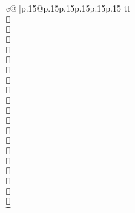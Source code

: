 \documentclass{article}
\begin{document}
{\begin{supertabular}{c@{$\;$}|p{.15\linewidth}@{}p{.15\linewidth}p{.15\linewidth}p{.15\linewidth}p{.15\linewidth}p{.15\linewidth}}
{{{tt 📐\\ \tt 📐\\ \tt 📐\\ \tt 📐\\ \tt 📐\\ \tt 📐\\ \tt 📐\\ \tt 📐\\ \tt 📐\\ \tt 📐\\ \tt 📐\\ \tt 📐\\ \tt 📐\\ \tt 📐\\ \tt 📐\\ \tt 📐\\ \tt 📐\\ \tt 📐\\ \tt 📐\\ \tt 📐\\ \t}}}
\end{supertabular}}
\end{document}

